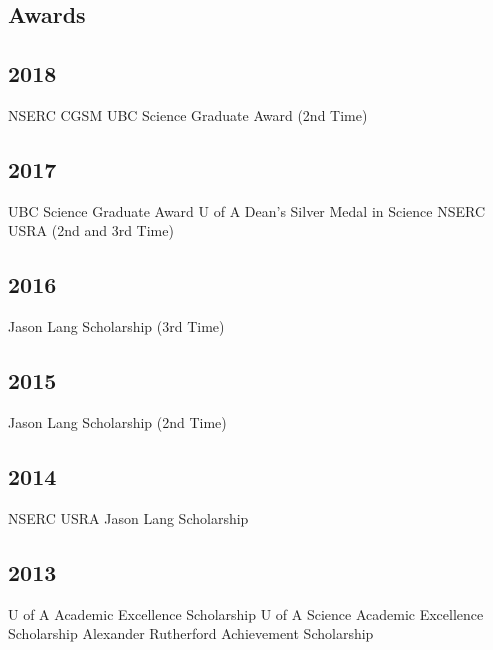 \documentclass{friggeri-cv}
\begin{document}
\newpage

\begin{asidenotit}
\section{Awards}
\subsection{2018}
NSERC CGSM 
UBC Science Graduate Award
(2nd Time)
\subsection{2017}
UBC Science Graduate Award 
U of A Dean's Silver Medal in Science 
NSERC USRA
(2nd and 3rd Time)
\subsection{2016}
Jason Lang Scholarship
(3rd Time)
\subsection{2015}
Jason Lang Scholarship
(2nd Time)
\subsection{2014}
NSERC USRA 
Jason Lang Scholarship
\subsection{2013}
U of A Academic Excellence Scholarship 
U of A Science Academic Excellence Scholarship 
Alexander Rutherford Achievement Scholarship
\end{asidenotit}
\end{document}
